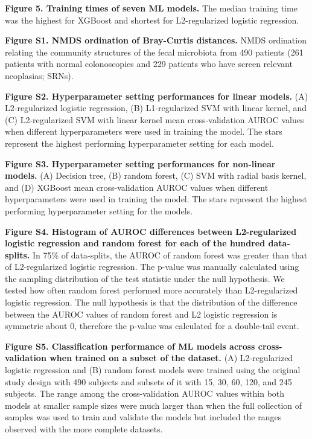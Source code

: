 \documentclass[
  11pt,
]{article}
\begin{document}
\hfill\break

\textbf{Figure 5. Training times of seven ML models.} The median
training time was the highest for XGBoost and shortest for
L2-regularized logistic regression.

\newpage

\textbf{Figure S1. NMDS ordination of Bray-Curtis distances.} NMDS
ordination relating the community structures of the fecal microbiota
from 490 patients (261 patients with normal colonoscopies and 229
patients who have screen relevant neoplasias; SRNs).

\hfill\break

\textbf{Figure S2. Hyperparameter setting performances for linear
models.} (A) L2-regularized logistic regression, (B) L1-regularized SVM
with linear kernel, and (C) L2-regularized SVM with linear kernel mean
cross-validation AUROC values when different hyperparameters were used
in training the model. The stars represent the highest performing
hyperparameter setting for each model.

\hfill\break

\textbf{Figure S3. Hyperparameter setting performances for non-linear
models.} (A) Decision tree, (B) random forest, (C) SVM with radial basis
kernel, and (D) XGBoost mean cross-validation AUROC values when
different hyperparameters were used in training the model. The stars
represent the highest performing hyperparameter setting for the models.

\hfill\break

\textbf{Figure S4. Histogram of AUROC differences between L2-regularized
logistic regression and random forest for each of the hundred
data-splits.} In 75\% of data-splits, the AUROC of random forest was
greater than that of L2-regularized logistic regression. The p-value was
manually calculated using the sampling distribution of the test
statistic under the null hypothesis. We tested how often random forest
performed more accurately than L2-regularized logistic regression. The
null hypothesis is that the distribution of the difference between the
AUROC values of random forest and L2 logistic regression is symmetric
about 0, therefore the p-value was calculated for a double-tail event.

\hfill\break

\textbf{Figure S5. Classification performance of ML models across
cross-validation when trained on a subset of the dataset.} (A)
L2-regularized logistic regression and (B) random forest models were
trained using the original study design with 490 subjects and subsets of
it with 15, 30, 60, 120, and 245 subjects. The range among the
cross-validation AUROC values within both models at smaller sample sizes
were much larger than when the full collection of samples was used to
train and validate the models but included the ranges observed with the
more complete datasets.
\end{document}
